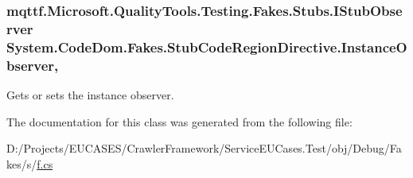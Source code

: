 \hypertarget{class_system_1_1_code_dom_1_1_fakes_1_1_stub_code_region_directive_a84c9360d4ad1750723fc6c2c299ecff2}{
\subsubsection[{Instance\-Observer}]{\setlength{\rightskip}{0pt plus 5cm}mqttf.\-Microsoft.\-Quality\-Tools.\-Testing.\-Fakes.\-Stubs.\-I\-Stub\-Observer System.\-Code\-Dom.\-Fakes.\-Stub\-Code\-Region\-Directive.\-Instance\-Observer\hspace{0.3cm}{\ttfamily [get]}, {\ttfamily [set]}}}\label{class_system_1_1_code_dom_1_1_fakes_1_1_stub_code_region_directive_a84c9360d4ad1750723fc6c2c299ecff2}


Gets or sets the instance observer.



The documentation for this class was generated from the following file\-:\begin{DoxyCompactItemize}
\item 
D\-:/\-Projects/\-E\-U\-C\-A\-S\-E\-S/\-Crawler\-Framework/\-Service\-E\-U\-Cases.\-Test/obj/\-Debug/\-Fakes/s/\hyperlink{s_2f_8cs}{f.\-cs}\end{DoxyCompactItemize}
